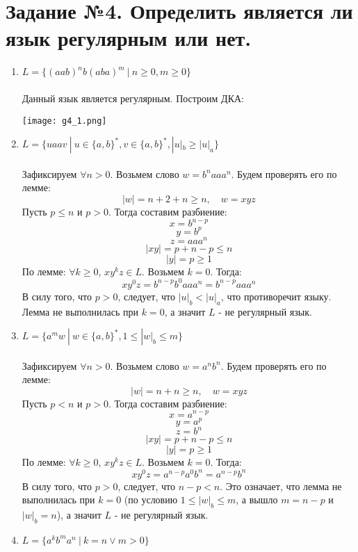 \documentclass{article}
\begin{document}
\section{Задание №4. Определить является ли язык регулярным или нет.}
\begin{enumerate}
    \item {$L = \{ (aab)^n b(aba)^m \ | \ n \geq 0, m \geq 0 \}$} \\ \\
    Данный язык является регулярным. Построим ДКА:
    \begin{flushleft}
        \texttt{[image: g4\_1.png]}
    \end{flushleft}
    \item {$L = \{ uaav \ | \ u \in \{ a,b\}^*, v \in \{a, b\}^*, |u|_b \geq |u|_a \}$} \\ \\
    Зафиксируем $\forall n > 0$. Возьмем слово $w = b^n aa a^n$. Будем проверять его по лемме:
    $$ |w| = n + 2 + n \geq n, \quad w = xyz $$ 
    Пусть $p \leq n$ и $p > 0 $. Тогда составим разбиение:
    $$ x = b^{n-p} $$
    $$ y = b^p $$
    $$ z = aaa^n $$
    $$ |xy| = p + n - p \leq n $$
    $$ |y| = p \geq 1 $$
    По лемме: $\forall k \geq 0$,  $xy^kz \in L$.
    Возьмем $ k = 0 $. Тогда:
    $$ xy^0z = b^{n-p}b^0aaa^n = b^{n-p}aaa^n $$
    В силу того, что $ p > 0 $, следует, что $ |u|_b < |u|_a $, что противоречит языку. Лемма не выполнилась при $k = 0$, а значит $L$ - не регулярный язык.
    \item {$L = \{ a^mw \ | \ w \in \{ a,b \}^*, 1 \leq |w|_b \leq m \}$} \\ \\
    Зафиксируем $\forall n > 0$. Возьмем слово $w = a^n b^n$. Будем проверять его по лемме:
    $$ |w| = n + n \geq n, \quad w = xyz $$ 
    Пусть $p < n$ и $ p > 0 $. Тогда составим разбиение:
    $$ x = a^{n-p} $$
    $$ y = a^p $$
    $$ z = b^n $$
    $$ |xy| = p + n - p \leq n $$
    $$ |y| = p \geq 1 $$
    По лемме: $\forall k \geq 0$,  $xy^kz \in L$.
    Возьмем $ k = 0 $. Тогда:
    $$ xy^0z = a^{n-p}a^0b^n = a^{n-p}b^n $$
    В силу того, что $ p > 0 $, следует, что $ n-p < n $. Это означает, что лемма не выполнилась при $ k = 0 $ (по условию $1 \leq |w|_b \leq m$, а вышло $m = n-p$ и $|w|_b = n$), а значит $L$ - не регулярный язык.
    \item {$L = \{ a^k b^m a^n \ | \ k = n \vee m > 0 \}$} \\ \\

\end{enumerate}
\end{document}

